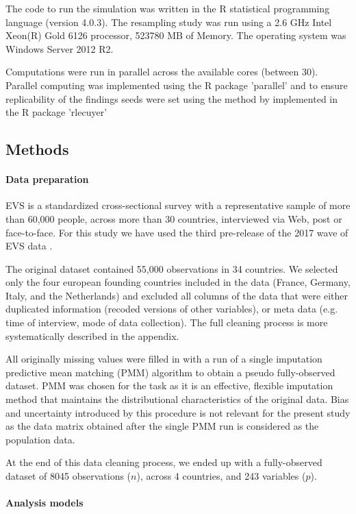 	The code to run the simulation was written in the R statistical programming language (version 4.0.3). 
	The resampling study was run using a 2.6 GHz Intel Xeon(R) Gold 6126 processor, 523780 MB of Memory. The
	operating system was Windows Server 2012 R2.

	Computations were run in parallel across the available cores (between 30). Parallel computing 
	was implemented using the R package 'parallel' and to ensure replicability of the findings seeds were
	set using the method by \cite{lecuyer:2002} implemented in the R package 'rlecuyer'

\subsection{Methods}

\paragraph{Data preparation}
	EVS is a standardized cross-sectional survey with a representative sample of more than 60,000 
	people, across more than 30 countries, interviewed via Web, post or face-to-face.
	For this study we have used the third pre-release of the 2017 wave of EVS data \citep{EVS:2017}.

	The original dataset contained 55,000 observations in 34 countries.
	We selected only the four european founding countries included in the data (France, Germany,
	Italy, and the Netherlands) and excluded all columns of the data that were either duplicated
	information (recoded versions of other variables), or meta data (e.g. time of interview,
	mode of data collection). 
	The full cleaning process is more systematically described in the appendix.

	All originally missing values were filled in with a run of a single imputation predictive mean matching (PMM) 
	algorithm to obtain a pseudo fully-observed dataset.
	PMM was chosen for the task as it is an effective, flexible imputation method that maintains the 
	distributional characteristics of the original data.
	Bias and uncertainty introduced by this procedure is not relevant for the present study as the data matrix
	obtained after the single PMM run is considered as the population data.
	
	At the end of this data cleaning process, we ended up with a fully-observed dataset
	of 8045 observations ($n$), across 4 countries, and 243 variables ($p$).

\paragraph{Analysis models}

